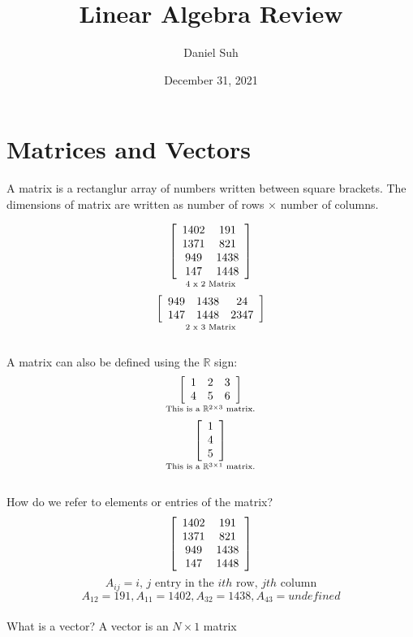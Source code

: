 \documentclass{article}
\title{Linear Algebra Review}
\author{Daniel Suh}
\date{December 31, 2021}
\begin{document}
\maketitle

\section{Matrices and Vectors}
A matrix is a rectanglur array of numbers written between square brackets. The dimensions of matrix are written as number of rows $\times$ number of columns.

\[
    \underset{\text{4 x 2 Matrix}}{
        \left[\begin{array}[]{cc}
            1402 & 191 \\
            1371 & 821 \\
            949 & 1438 \\
            147 & 1448 \\
        \end{array}\right]
    }
\]
\[
    \underset{\text{2 x 3 Matrix}}{
        \left[\begin{array}[]{ccc}
            949 & 1438 & 24\\
            147 & 1448 & 2347\\
        \end{array}\right]
    }
\]\\
A matrix can also be defined using the $\mathbb{R}$ sign:
\[
\underset{\text{This is a }\mathbb{R}^{2 \times 3} \text{ matrix.}}{
    \left[\begin{array}[]{ccc}
        1 & 2 & 3\\
        4 & 5 & 6\\
    \end{array}\right]
}
\]
\[
\underset{\text{This is a }\mathbb{R}^{3 \times 1} \text{ matrix.}}{
    \left[\begin{array}[]{c}
        1\\
        4\\
        5\\
    \end{array}\right]
}
\]\\
How do we refer to elements or entries of the matrix?
\[
    \left[\begin{array}[]{cc}
        1402 & 191 \\
        1371 & 821 \\
        949 & 1438 \\
        147 & 1448 \\
    \end{array}\right]
\]
\[
    A_{ij} = \text{$i$, $j$ entry in the $ith$ row, $jth$ column}
\]
\[
    A_{12} = 191, 
    A_{11} = 1402,
    A_{32} = 1438,
    A_{43} = undefined
\]\\
What is a vector? A vector is an $N \times 1$ matrix
\end{document}
